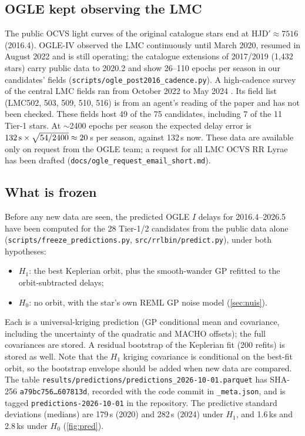 \documentclass[11pt]{article}
\begin{document}
\subsection{OGLE kept observing the LMC}
The public OCVS light curves of the original catalogue stars end at HJD$'\approx7516$ (2016.4). OGLE-IV observed the LMC
continuously until March 2020, resumed in August 2022 and is still operating; the catalogue extensions of 2017/2019 (1{,}432
stars) carry public data to 2020.2 and show 26--110 epochs per season in our candidates' fields
(\texttt{scripts/ogle\_post2016\_cadence.py}). A high-cadence survey of the central LMC fields ran from October 2022 to May 2024
\citep{Mroz2024}. Its field list (LMC502, 503, 509, 510, 516) is from an agent's reading of the paper and has not been checked.
These fields host 49 of the 75 candidates, including 7 of the 11 Tier-1 stars. At $\sim$2400 epochs per season the expected
delay error is $132\,{\rm s}\times\sqrt{54/2400}\approx20$\,s per season, against 132\,s now. These data are available only on
request from the OGLE team; a request for all LMC OCVS RR Lyrae has been drafted (\texttt{docs/ogle\_request\_email\_short.md}).

\subsection{What is frozen}
Before any new data are seen, the predicted OGLE $I$ delays for 2016.4--2026.5 have been computed for the 28 Tier-1/2
candidates from the public data alone (\texttt{scripts/freeze\_predictions.py}, \texttt{src/rrlbin/predict.py}), under both hypotheses:
\begin{itemize}[leftmargin=*]
\item $H_1$: the best Keplerian orbit, plus the smooth-wander GP refitted to the orbit-subtracted delays;
\item $H_0$: no orbit, with the star's own REML GP noise model (\cref{sec:nuis}).
\end{itemize}
Each is a universal-kriging prediction (GP conditional mean and covariance, including the uncertainty of the quadratic and
MACHO offsets); the full covariances are stored. A residual bootstrap of the Keplerian fit (200 refits) is stored as well. Note
that the $H_1$ kriging covariance is conditional on the best-fit orbit, so the bootstrap envelope should be added when new
data are compared. The table \texttt{results/predictions/predictions\_2026-10-01.parquet} has SHA-256
\texttt{a79bc756\ldots607813d}, recorded with the code commit in \texttt{\_meta.json}, and is tagged
\texttt{predictions-2026-10-01} in the repository. The predictive standard deviations (medians) are 179\,s (2020) and 282\,s
(2024) under $H_1$, and 1.6\,ks and 2.8\,ks under $H_0$ (\cref{fig:pred}).
\end{document}
